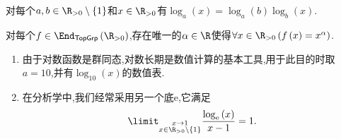\begin{proposition}{}{}
	对每个$a,b\in\R_{>0}\setminus\left\{1\right\}$和$x\in\R_{>0}$有$\log_{a}\left(x\right)=\log_{a}\left(b\right)\log_{b}\left(x\right)$.
\end{proposition}

\begin{proposition}{}{}
	对每个$f\in\End_{\mathsf{TopGrp}}\left(\R_{>0}\right)$,存在唯一的$\alpha\in\R$使得$\forall x\in\R_{>0}\left(f\left(x\right)=x^{\alpha}\right)$.
\end{proposition}

\begin{remark}{}{}
	\begin{enumerate}
		\item 由于对数函数是群同态,对数长期是数值计算的基本工具,用于此目的时取$a=10$,并有$\log_{10}\left(x\right)$的数值表.
		\item 在分析学中,我们经常采用另一个底$\mathrm{e}$,它满足
		\begin{align*}
			\limit_{\substack{x\to 1\\ x\in\R_{>0}\setminus\left\{1\right\}}}\frac{\log_{\mathrm{e}}\left(x\right)}{x-1}=1.
		\end{align*}
	\end{enumerate}
\end{remark}



















